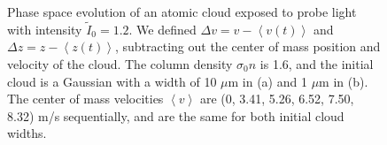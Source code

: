 \begin{figure}
\caption{Phase space evolution of an atomic cloud exposed to probe light with intensity $\tilde{I}_0=1.2$. We defined $\Delta v=v -\left< v(t) \right>$  and $\Delta z=z-\left< z(t) \right>$, subtracting out the center of mass position and velocity of the cloud. The column density $\sigma_0 n$ is 1.6, and the initial cloud is a Gaussian with a width of 10 $\mu$m in (a) and 1 $\mu$m in (b). The center of mass velocities $\left< v\right>$ are (0,  3.41, 5.26, 6.52, 7.50, 8.32) m/s sequentially, and are the same for both initial cloud widths. }
\label{fig:phaseSpace}
\end{figure}

